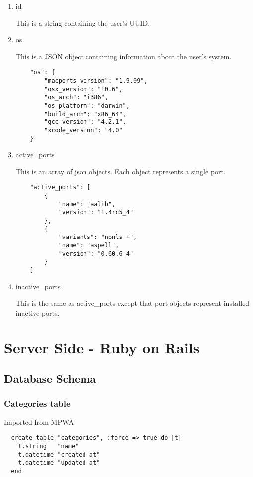 \documentclass[10pt]{article}
\begin{document}
\begin{enumerate}
  \item id
  
  This is a string containing the user's UUID.
  
  \item os
  
  This is a JSON object containing information about the user's system.
  
  \begin{verbatim}
    "os": {
        "macports_version": "1.9.99",
        "osx_version": "10.6",
        "os_arch": "i386",
        "os_platform": "darwin",
        "build_arch": "x86_64",
        "gcc_version": "4.2.1",
        "xcode_version": "4.0"
    }
  \end{verbatim}
  
  \item active\_ports
  
  This is an array of json objects. Each object represents a single port.
  
  \begin{verbatim}
    "active_ports": [
        {
            "name": "aalib",
            "version": "1.4rc5_4"
        },
        {
            "variants": "nonls +",
            "name": "aspell",
            "version": "0.60.6_4"
        }
    ]
  \end{verbatim}
  
  \item inactive\_ports
  
  This is the same as active\_ports except that port objects represent installed inactive ports.
\end{enumerate}

\section{Server Side - Ruby on Rails}
\subsection{Database Schema}

\subsubsection {Categories table}

Imported from MPWA

\begin{verbatim}
  create_table "categories", :force => true do |t|
    t.string   "name"
    t.datetime "created_at"
    t.datetime "updated_at"
  end
\end{verbatim}
\end{document}
